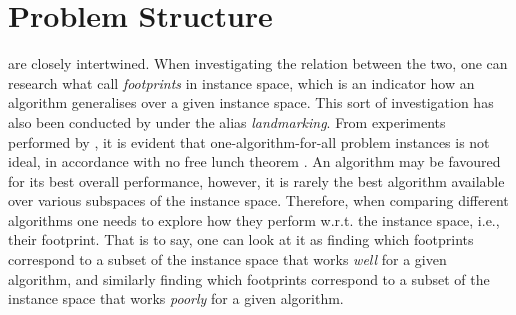 
\chapter{Problem Structure}\label{ch:problemstructure} 



 are closely intertwined. When investigating the relation between the two, one can research what \citet{Corne10} call \emph{footprints} in instance space, which is an indicator how an algorithm generalises over a given instance space. This sort of investigation has also been conducted by \citet{Pfahringer00} under the alias \emph{landmarking}. 
From experiments performed by \citeauthor{Corne10}, it is evident that 
one-algorithm-for-all problem instances is not ideal, in accordance with no 
free lunch theorem \citep{Wolpert97nofree}. An algorithm may be favoured for 
its best overall performance, however, it is rarely the best algorithm 
available over various subspaces of the instance space.
Therefore, when comparing different algorithms one needs to explore how they perform w.r.t. the instance space, i.e., their footprint. That is to say, one can look at it as finding which footprints correspond to a subset of the instance space that works \emph{well} for a given algorithm, and similarly finding which footprints correspond to a subset of the instance space that works \emph{poorly} for a given algorithm. 

